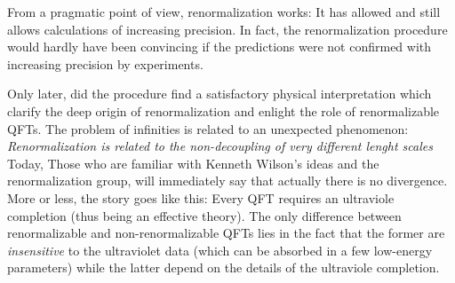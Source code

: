 From a pragmatic point of view, 
renormalization works: It 
has allowed and still allows calculations of increasing precision.
In fact, the renormalization procedure would hardly have been convincing if the
predictions were not confirmed with increasing precision by experiments.

Only later, did the procedure find a satisfactory physical interpretation which
clarify the deep origin of renormalization and enlight the role of
renormalizable QFTs.
   The problem of infinities is related to an unexpected phenomenon:
   \emph{Renormalization is related to the non-decoupling of very different
      lenght scales}
Today, Those who are familiar with Kenneth Wilson's ideas and the renormalization
group, will immediately say that actually there is no divergence.
More or less, the story goes like this: 
Every QFT requires an ultraviole completion (thus being an effective theory).
The only difference between renormalizable and non-renormalizable QFTs lies in
the fact that the former are \emph{insensitive} to the ultraviolet data (which
can be absorbed in a few low-energy parameters) while the latter depend on the
details of the ultraviole completion.



 
